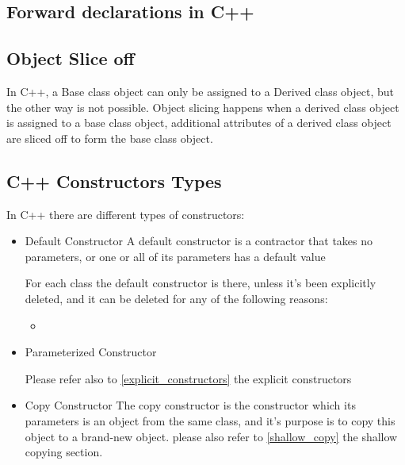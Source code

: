 \documentclass{article}
\begin{document}
\subsection{Forward declarations in C++}

\subsection{Object Slice off}
In C++, a Base class object can only be assigned to a Derived class object, but the other way is not possible.
Object slicing happens when a derived class object is assigned to a base class object, additional attributes of a derived class object are sliced off to form the base class object.



\subsection{C++ Constructors Types}
In C++ there are different types of constructors:
\begin{itemize}
  \item Default Constructor
  A default constructor is a contractor that takes no parameters, or one or all of its parameters has a default value

  For each class the default constructor is there, unless it's been explicitly deleted, and it can be deleted for any of the following reasons:
  \begin{itemize}
    \item 
  \end{itemize}

  


  \item Parameterized Constructor
  
  Please refer also to \ref{explicit_constructors} the explicit constructors

  \item Copy Constructor
  The copy constructor is the constructor which its parameters is an object from the same class, and it's purpose is to copy this object to a brand-new object. please also refer to \ref{shallow_copy} the shallow copying section.

  


\end{itemize}
\end{document}
